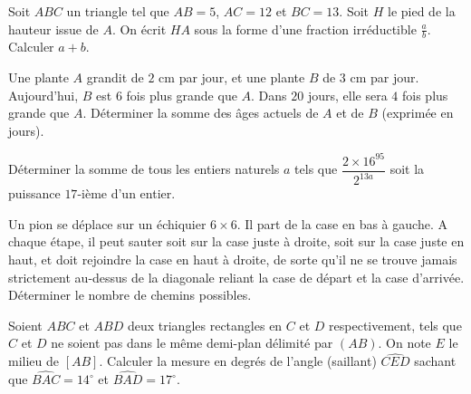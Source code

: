 \begin{exo}
 Soit $ABC$ un triangle tel que $AB=5$, $AC=12$ et $BC=13$. Soit $H$ le pied de la hauteur issue de $A$.
On écrit $HA$ sous la forme d'une fraction irréductible $\frac{a}{b}$. Calculer $a+b$.
\end{exo}






\begin{exo}
Une plante $A$ grandit de $2$ cm par jour, et une plante $B$ de $3$ cm par jour. Aujourd'hui, $B$ est $6$ fois
plus grande que $A$. Dans $20$ jours, elle sera $4$ fois plus grande que $A$. Déterminer la somme des
âges actuels de $A$ et de $B$ (exprimée en jours). 
\end{exo}



\begin{exo}
 Déterminer la somme de tous les entiers naturels $a$ tels que $\dfrac{2\times 16^{95}}{2^{13a}}$ soit la puissance $17$-ième
d'un entier.
\end{exo}



\begin{exo}
 Un pion se déplace sur un échiquier $6\times 6$. Il part de la case en bas à gauche. A chaque étape, il peut sauter soit
sur la case juste à droite, soit sur la case juste en haut, et doit rejoindre la case en haut à droite, de sorte qu'il ne se
trouve jamais strictement au-dessus de la diagonale reliant la case de départ et la case d'arrivée. Déterminer le nombre
de chemins possibles.
\end{exo}


\begin{exo}
Soient $ABC$ et $ABD$ deux triangles rectangles en $C$ et $D$ respectivement, tels que $C$ et $D$ ne soient pas dans le même
demi-plan délimité par $(AB)$. On note $E$ le milieu de $[AB]$. Calculer la mesure en degrés de
l'angle (saillant) $\widehat{CED}$ sachant que $\widehat{BAC}=14^\circ$
et $\widehat{BAD}=17^\circ$.
\end{exo}

